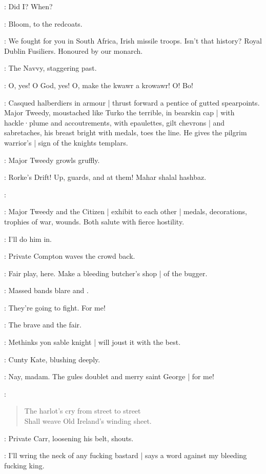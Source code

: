 \Stephen:
Did I?
When?

:
Bloom,
to the redcoats.

\Bloom:
We fought for you in South Africa,
Irish missile troops.
Isn't that history?
Royal Dublin Fusiliers.
Honoured by our monarch.

:
The Navvy,
staggering past.

\Navvy:
O,
yes!
O God,
yes!
O,
make the kwawr a krowawr!
O! Bo!%

:
Casqued halberdiers in armour |
thrust forward a pentice of gutted spearpoints.
Major Tweedy,
moustached like Turko the terrible,
in bearskin cap |
with hackle·plume and accoutrements,
with epaulettes,
gilt chevrons |
and sabretaches,
his breast bright with medals,
toes the line.
He gives the pilgrim warrior's |
sign of the knights templars.

:
Major Tweedy growls gruffly.

\MajorTweedy:
Rorke's Drift!
Up,
guards,
and at them!
Mahar shalal hashbaz.

\Citizen[2]:

:
Major Tweedy and the Citizen |
exhibit to each other |
medals,
decorations,
trophies of war,
wounds.
Both salute with fierce hostility.

\Carr[2]:
I'll do him in.

:
Private Compton waves the crowd back.

\Compton:
Fair play,
here.
Make a bleeding butcher's shop |
of the bugger.

:
Massed bands blare  and .%

\Cissy[2]:
They're going to fight.
For me!

\CuntyKate[2]:
The brave and the fair.

\BiddyClap[2]:
Methinks yon sable knight |
will joust it with the best.

:
Cunty Kate,
blushing deeply.

\CuntyKate:
Nay,
madam.
The gules doublet and merry saint George |
for me!

\Stephen:
\begin{verse}
    The harlot's cry from street to street\\
    Shall weave Old Ireland's winding sheet.
\end{verse}

:
Private Carr,
loosening his belt,
shouts.

\Carr:
I'll wring the neck of any fucking bastard |
says a word against my bleeding fucking king.

